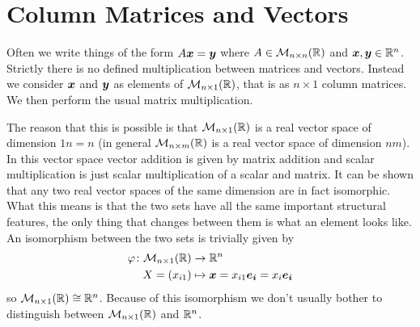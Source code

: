 \section{Column Matrices and Vectors}\label{app:column matrices and vectors}
Often we write things of the form \(A\bm{x} = \bm{y}\) where \(A\in\mathcal{M}_{{n}\times{n}}({\mathbb{R}})\) and \(\bm{x}, \bm{y}\in\mathbb{R}^n\).
Strictly there is no defined multiplication between matrices and vectors.
Instead we consider \(\bm{x}\) and \(\bm{y}\) as elements of \(\mathcal{M}_{{n}\times{1}}({\mathbb{R}})\), that is as \(n\times 1\) column matrices.
We then perform the usual matrix multiplication.

The reason that this is possible is that \(\mathcal{M}_{{n}\times{1}}({\mathbb{R}})\) is a real vector space of dimension \(1n = n\) (in general \(\mathcal{M}_{{n}\times{m}}({\mathbb{R}})\) is a real vector space of dimension \(nm\)).
In this vector space vector addition is given by matrix addition and scalar multiplication is just scalar multiplication of a scalar and matrix.
It can be shown that any two real vector spaces of the same dimension are in fact isomorphic.
What this means is that the two sets have all the same important structural features, the only thing that changes between them is what an element looks like.
An isomorphism between the two sets is trivially given by
\begin{align*}
    \varphi\colon\mathcal{M}_{{n}\times{1}}({\mathbb{R}}) &\to \mathbb{R}^n\\
    X = (x_{i1}) &\mapsto \bm{x} = x_{i1}\bm{e_{i}} = x_i\bm{e_{i}}
\end{align*}
so \(\mathcal{M}_{{n}\times{1}}({\mathbb{R}})\cong\mathbb{R}^n\).
Because of this isomorphism we don't usually bother to distinguish between \(\mathcal{M}_{{n}\times{1}}({\mathbb{R}})\) and \(\mathbb{R}^n\).

